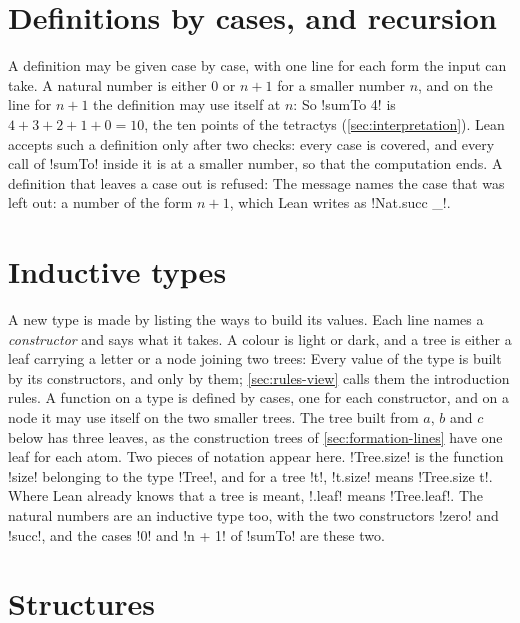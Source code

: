 \section*{Definitions by cases, and recursion}

A definition may be given case by case, with one line for each form the input
can take. A natural number is either $0$ or $n+1$ for a smaller number $n$,
and on the line for $n+1$ the definition may use itself at $n$:
So \li!sumTo 4! is $4+3+2+1+0=10$, the ten points of the tetractys
(\cref{sec:interpretation}). Lean accepts such a definition only after two
checks: every case is covered, and every call of \li!sumTo! inside it is at a
smaller number, so that the computation ends. A definition that leaves a case
out is refused:
The message names the case that was left out: a number of the form $n+1$,
which Lean writes as \li!Nat.succ _!.

\section*{Inductive types}

A new type is made by listing the ways to build its values. Each line names a
\emph{constructor} and says what it takes. A colour is light or dark, and a
tree is either a leaf carrying a letter or a node joining two trees:
Every value of the type is built by its constructors, and only by them;
\cref{sec:rules-view} calls them the introduction rules. A function on a type
is defined by cases, one for each constructor, and on a node it may use
itself on the two smaller trees. The tree built from $a$, $b$ and $c$ below
has three leaves, as the construction trees of \cref{sec:formation-lines}
have one leaf for each atom.
Two pieces of notation appear here. \li!Tree.size! is the function \li!size!
belonging to the type \li!Tree!, and for a tree \li!t!, \li!t.size! means
\li!Tree.size t!. Where Lean already knows that a tree is meant, \li!.leaf!
means \li!Tree.leaf!. The natural numbers are an inductive type too, with the
two constructors \li!zero! and \li!succ!, and the cases \li!0! and \li!n + 1!
of \li!sumTo! are these two.

\section*{Structures}

